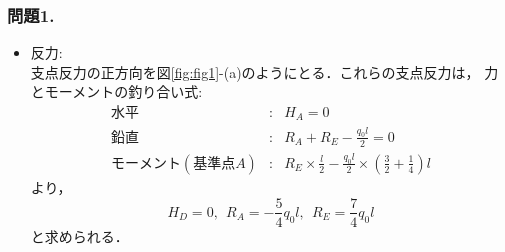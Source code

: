 \documentclass[10pt,a4j]{jarticle}
\begin{document}
\subsubsection*{問題1.}
\begin{itemize}
\item
	{\rm 反力:}\\
	支点反力の正方向を図\ref{fig:fig1}-(a)のようにとる．これらの支点反力は，
	力とモーメントの釣り合い式:
	\begin{eqnarray*}
		水平 &:& H_A=0 \\
		鉛直 &:& R_A+R_E-\frac{q_0l}{2}=0 \\
		モーメント(基準点A) &:& R_E \times \frac{l}{2}-
		\frac{q_0l}{2}\times \left(\frac{3}{2}+\frac{1}{4}\right)l
	\end{eqnarray*}
	より，
	\[
		H_D=0, \ \ 
		R_A=-\frac{5}{4}q_0l, \ \
		R_E=\frac{7}{4}q_0l
	\]	
	と求められる．\\


\end{itemize}
\end{document}
